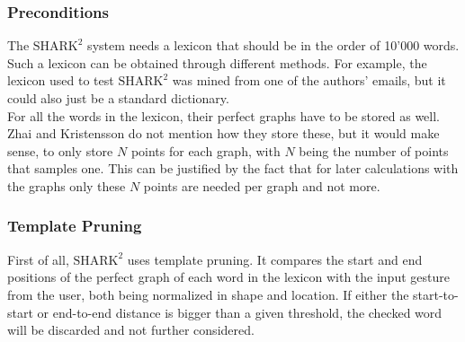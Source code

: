 \subsubsection{Preconditions}
The $\text{SHARK}^2$ system needs a lexicon that should be in the order of 10'000 words. Such a lexicon can be obtained through different methods. For example, the lexicon used to test $\text{SHARK}^2$ was mined from one of the authors' emails, but it could also just be a standard dictionary.\\
For all the words in the lexicon, their perfect graphs have to be stored as well. Zhai and Kristensson \cite{Kristensson2004SHARK2AL} do not mention how they store these, but it would make sense, to only store $N$ points for each graph, with $N$ being the number of points that samples one. This can be justified by the fact that for later calculations with the graphs only these $N$ points are needed per graph and not more.

\subsubsection{Template Pruning}
First of all, $\text{SHARK}^2$ uses template pruning. It compares the start and end positions of the perfect graph of each word in the lexicon with the input gesture from the user, both being normalized in shape and location. If either the start-to-start or end-to-end distance is bigger than a given threshold, the checked word will be discarded and not further considered.

